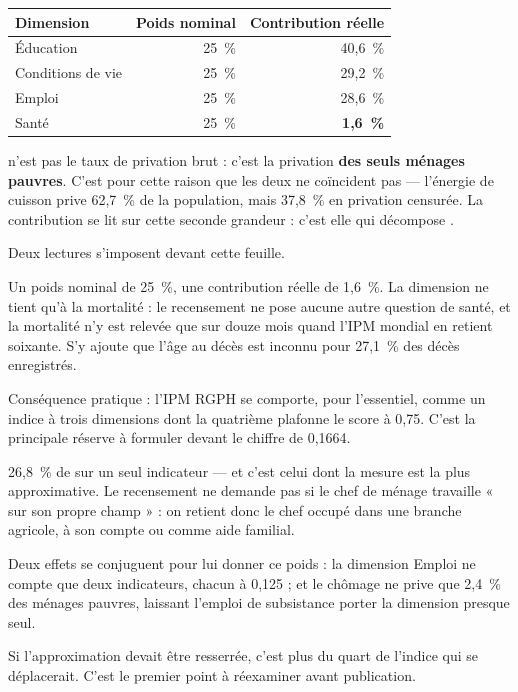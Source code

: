 \documentclass[11pt,a4paper]{article}
\begin{document}
\begin{center}
\begin{tabular}{@{}lrr@{}}
\toprule
\textbf{Dimension} & \textbf{Poids nominal} & \textbf{Contribution réelle} \\
\midrule
Éducation & 25~\% & 40,6~\% \\
Conditions de vie & 25~\% & 29,2~\% \\
Emploi & 25~\% & 28,6~\% \\
Santé & 25~\% & \textbf{1,6~\%} \\
\bottomrule
\end{tabular}
\end{center}

\begin{retenir}
 n'est pas le taux de privation brut : c'est la privation
\textbf{des seuls ménages pauvres}. C'est pour cette raison que les deux ne coïncident pas ---
l'énergie de cuisson prive 62,7~\% de la population, mais 37,8~\% en privation censurée. La
contribution se lit sur cette seconde grandeur : c'est elle qui décompose \ipm{}.
\end{retenir}

Deux lectures s'imposent devant cette feuille.

\begin{attention}
Un poids nominal de 25~\%, une contribution réelle de 1,6~\%. La dimension ne tient qu'à la
mortalité : le recensement ne pose aucune autre question de santé, et la mortalité n'y est relevée
que sur douze mois quand l'IPM mondial en retient soixante. S'y ajoute que l'âge au décès est
inconnu pour 27,1~\% des décès enregistrés.

Conséquence pratique : l'IPM RGPH se comporte, pour l'essentiel, comme un indice à trois dimensions
dont la quatrième plafonne le score à 0,75. C'est la principale réserve à formuler devant le
chiffre de 0,1664.
\end{attention}

\begin{attention}
26,8~\% de \ipm{} sur un seul indicateur --- et c'est celui dont la mesure est la plus approximative.
Le recensement ne demande pas si le chef de ménage travaille « sur son propre champ » : on retient
donc le chef occupé dans une branche agricole, à son compte ou comme aide familial.

Deux effets se conjuguent pour lui donner ce poids : la dimension Emploi ne compte que deux
indicateurs, chacun à 0,125 ; et le chômage ne prive que 2,4~\% des ménages pauvres, laissant
l'emploi de subsistance porter la dimension presque seul.

Si l'approximation devait être resserrée, c'est plus du quart de l'indice qui se déplacerait. C'est
le premier point à réexaminer avant publication.
\end{attention}
\end{document}
